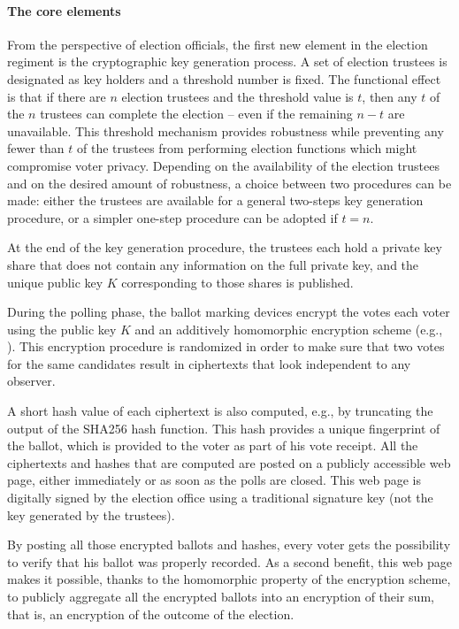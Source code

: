 \label{sec:crypto}


\paragraph{The core elements}
\label{sec:crypto-core}

From the perspective of election officials, the first new element in
the election regiment is the cryptographic key generation process. A
set of election trustees is designated as key holders and a threshold
number is fixed. The functional effect is that if there are $n$
election trustees and the threshold value is $t$, then any $t$ of the
$n$ trustees can complete the election – even if the remaining $n-t$
are unavailable. This threshold mechanism provides robustness while
preventing any fewer than $t$ of the trustees from performing election
functions which might compromise voter privacy. Depending on the
availability of the election trustees and on the desired amount of
robustness, a choice between two procedures can be made: either the
trustees are available for a general two-steps key generation
procedure, or a simpler one-step procedure can be adopted if $t=n$.

At the end of the key generation procedure, the trustees each hold a
private key share that does not contain any information on the full
private key, and the unique public key $K$ corresponding to those
shares is published.

During the polling phase, the ballot marking devices encrypt the votes
each voter using the public key $K$ and an additively homomorphic
encryption scheme (e.g., \elgamal). This encryption procedure is
randomized in order to make sure that two votes for the same
candidates result in ciphertexts that look independent to any
observer. 

A short hash value of each ciphertext is also computed, e.g., by
truncating the output of the SHA256 hash function.  This hash provides
a unique fingerprint of the ballot, which is provided to the voter as
part of his vote receipt. All the ciphertexts and hashes that are
computed are posted on a publicly accessible web page, either
immediately or as soon as the polls are closed. This web page is
digitally signed by the election office using a traditional signature
key (not the key generated by the trustees).

By posting all those encrypted ballots and hashes, every voter gets
the possibility to verify that his ballot was properly recorded. As a
second benefit, this web page makes it possible, thanks to the
homomorphic property of the encryption scheme, to publicly aggregate
all the encrypted ballots into an encryption of their sum, that is, an
encryption of the outcome of the election.

